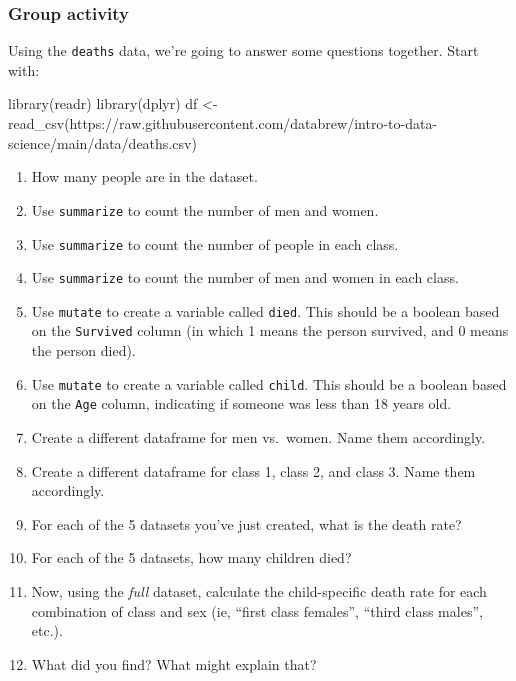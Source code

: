 \documentclass[
]{book}
\newenvironment{Shaded}{\begin{snugshade}}{\end{snugshade}}
\newcommand{\FunctionTok}[1]{\textcolor[rgb]{0.00,0.00,0.00}{#1}}
\newcommand{\NormalTok}[1]{#1}
\newcommand{\OtherTok}[1]{\textcolor[rgb]{0.56,0.35,0.01}{#1}}
\newcommand{\StringTok}[1]{\textcolor[rgb]{0.31,0.60,0.02}{#1}}
\begin{document}
\hypertarget{group-activity}{%
\subsubsection*{Group activity}\label{group-activity}}

Using the \texttt{deaths} data, we're going to answer some questions together. Start with:

\begin{Shaded}
\begin{Highlighting}[]
\FunctionTok{library}\NormalTok{(readr)}
\FunctionTok{library}\NormalTok{(dplyr)}
\NormalTok{df }\OtherTok{\textless{}{-}} \FunctionTok{read\_csv}\NormalTok{(}\StringTok{\textquotesingle{}https://raw.githubusercontent.com/databrew/intro{-}to{-}data{-}science/main/data/deaths.csv\textquotesingle{}}\NormalTok{)}
\end{Highlighting}
\end{Shaded}

\begin{enumerate}
\def\labelenumi{\arabic{enumi}.}
\item
  How many people are in the dataset.
\item
  Use \texttt{summarize} to count the number of men and women.
\item
  Use \texttt{summarize} to count the number of people in each class.
\item
  Use \texttt{summarize} to count the number of men and women in each class.
\item
  Use \texttt{mutate} to create a variable called \texttt{died}. This should be a boolean based on the \texttt{Survived} column (in which 1 means the person survived, and 0 means the person died).
\item
  Use \texttt{mutate} to create a variable called \texttt{child}. This should be a boolean based on the \texttt{Age} column, indicating if someone was less than 18 years old.
\item
  Create a different dataframe for men vs.~women. Name them accordingly.
\item
  Create a different dataframe for class 1, class 2, and class 3. Name them accordingly.
\item
  For each of the 5 datasets you've just created, what is the death rate?
\item
  For each of the 5 datasets, how many children died?
\item
  Now, using the \emph{full} dataset, calculate the child-specific death rate for each combination of class and sex (ie, ``first class females'', ``third class males'', etc.).
\item
  What did you find? What might explain that?
\end{enumerate}
\end{document}
